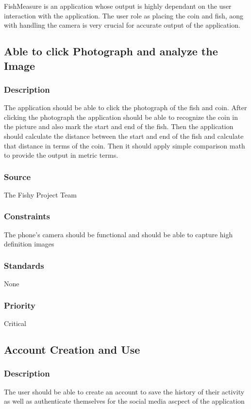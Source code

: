 FishMeasure is an application whose output is highly dependant on the user interaction with the application. The user role as placing the coin and fish, aong with handling the camera is very crucial for accurate output of the application.

\subsection{Able to click Photograph and analyze the Image}
\subsubsection{Description}
The application should be able to click the photograph of the fish and coin. After clicking the photograph the application should be able to recognize the coin in the picture and also mark the start and end of the fish. Then the application should calculate the distance between the start and end of the fish and calculate that distance in terms of the coin. Then it should apply simple comparison math to provide the output in metric terms.
\subsubsection{Source}
The Fishy Project Team
\subsubsection{Constraints}
The phone's camera should be functional and should be able to capture high definition images
\subsubsection{Standards}
None
\subsubsection{Priority}
Critical\\

\subsection{Account Creation and Use}
\subsubsection{Description}
The user should be able to create an account to save the history of their activity as well as authenticate themselves for the social media ascpect of the application
